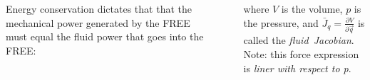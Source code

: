 \documentclass[25pt, a0paper, portrait]{tikzposter}
\begin{document}
\begin{columns}
{{    \vspace{25pt}
    
    Energy conservation dictates that that the mechanical power generated by the FREE must equal the fluid power that goes into the FREE:
    
    \vspace{12pt}
    \begin{centering}
    \end{centering}
    where $V$ is the volume, $p$ is the pressure, and $\bar{J}_q = \frac{\partial V}{\partial \vec{q}}$ is called the \emph{fluid~Jacobian}. \\
    Note: this force expression is \emph{liner with respect to p}.
    }
    
}
\end{columns}
\end{document}
